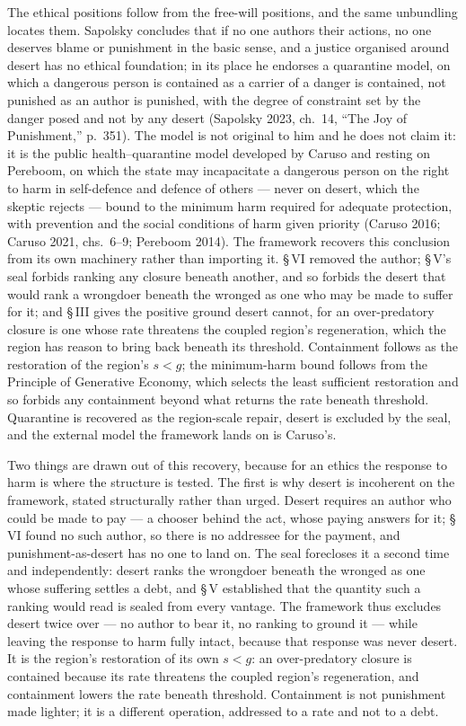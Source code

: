 \documentclass[11pt,oneside]{report}
\theoremstyle{definition}
\theoremstyle{remark}
\begin{document}
The ethical positions follow from the free-will positions, and the same unbundling locates them. Sapolsky concludes that if no one authors their actions, no one deserves blame or punishment in the basic sense, and a justice organised around desert has no ethical foundation; in its place he endorses a quarantine model, on which a dangerous person is contained as a carrier of a danger is contained, not punished as an author is punished, with the degree of constraint set by the danger posed and not by any desert (Sapolsky 2023, ch.~14, ``The Joy of Punishment,'' p.~351). The model is not original to him and he does not claim it: it is the public health--quarantine model developed by Caruso and resting on Pereboom, on which the state may incapacitate a dangerous person on the right to harm in self-defence and defence of others --- never on desert, which the skeptic rejects --- bound to the minimum harm required for adequate protection, with prevention and the social conditions of harm given priority (Caruso 2016; Caruso 2021, chs.~6--9; Pereboom 2014). The framework recovers this conclusion from its own machinery rather than importing it. \S\,VI removed the author; \S\,V's seal forbids ranking any closure beneath another, and so forbids the desert that would rank a wrongdoer beneath the wronged as one who may be made to suffer for it; and \S\,III gives the positive ground desert cannot, for an over-predatory closure is one whose rate threatens the coupled region's regeneration, which the region has reason to bring back beneath its threshold. Containment follows as the restoration of the region's \ensuremath{s < g}; the minimum-harm bound follows from the Principle of Generative Economy, which selects the least sufficient restoration and so forbids any containment beyond what returns the rate beneath threshold. Quarantine is recovered as the region-scale repair, desert is excluded by the seal, and the external model the framework lands on is Caruso's.

Two things are drawn out of this recovery, because for an ethics the response to harm is where the structure is tested. The first is why desert is incoherent on the framework, stated structurally rather than urged. Desert requires an author who could be made to pay --- a chooser behind the act, whose paying answers for it; \S\,VI found no such author, so there is no addressee for the payment, and punishment-as-desert has no one to land on. The seal forecloses it a second time and independently: desert ranks the wrongdoer beneath the wronged as one whose suffering settles a debt, and \S\,V established that the quantity such a ranking would read is sealed from every vantage. The framework thus excludes desert twice over --- no author to bear it, no ranking to ground it --- while leaving the response to harm fully intact, because that response was never desert. It is the region's restoration of its own \ensuremath{s < g}: an over-predatory closure is contained because its rate threatens the coupled region's regeneration, and containment lowers the rate beneath threshold. Containment is not punishment made lighter; it is a different operation, addressed to a rate and not to a debt.
\end{document}
